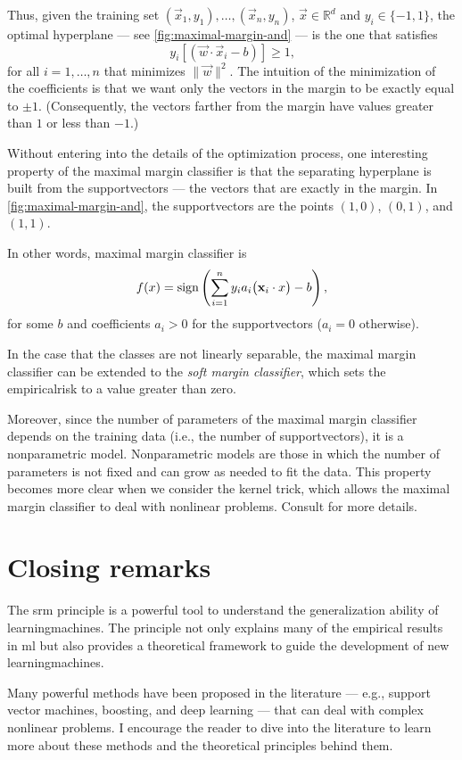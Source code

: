 Thus, given the training set $(\vec{x}_1, y_1), \dots, (\vec{x}_n, y_n)$, $\vec{x} \in
\mathbb{R}^d$ and $y_i \in \{-1, 1\}$, the optimal hyperplane --- see
\cref{fig:maximal-margin-and} --- is the one that satisfies
\[
  y_i \left[(\vec{w} \cdot \vec{x}_i - b)\right] \geq 1\text{,}
\]
for all $i = 1, \dots, n$ that minimizes $\|\vec{w}\|^2$.  The intuition of the
minimization of the coefficients is that we want only the vectors in the margin to be
exactly equal to $\pm 1$.  (Consequently, the vectors farther from the margin have values
greater than $1$ or less than $-1$.)

Without entering into the details of the optimization process, one interesting property of
the maximal margin classifier is that the separating hyperplane is built from the \glspl{supportvector}
--- the vectors that are exactly in the margin.  In \cref{fig:maximal-margin-and}, the
\glspl{supportvector} are the points $(1, 0)$, $(0, 1)$, and $(1, 1)$.

In other words, maximal margin classifier is
\[
  f(x) = \operatorname{sign}\left(\sum_{i=1}^{n} y_i a_i \big(\mathbf{x}_i \cdot x\big) - b\right)\text{,}
\]
for some $b$ and coefficients $a_i > 0$ for the \glspl{supportvector} ($a_i = 0$ otherwise).

In the case that the classes are not linearly separable, the maximal margin classifier can
be extended to the \emph{soft margin classifier}, which sets the \gls{empiricalrisk} to a value
greater than zero.

Moreover, since the number of parameters of the maximal margin classifier depends on the
training data (i.e., the number of \glspl{supportvector}), it is a nonparametric model.
Nonparametric models are those in which the number of parameters is not fixed and can grow
as needed to fit the data.  This property becomes more clear when we consider the kernel
trick, which allows the maximal margin classifier to deal with nonlinear problems.
Consult \textcite{Vapnik1999b} for more details.

\section{Closing remarks}


The \gls{srm} principle is a powerful tool to understand the generalization ability of
\glspl{learningmachine}.  The principle not only explains many of the empirical results in
\gls{ml} but also provides a theoretical framework to guide the development of new
\glspl{learningmachine}.

Many powerful methods have been proposed in the literature --- e.g., support vector
machines, boosting, and deep learning --- that can deal with complex nonlinear problems.
I encourage the reader to dive into the literature to learn more about these methods and
the theoretical principles behind them.

